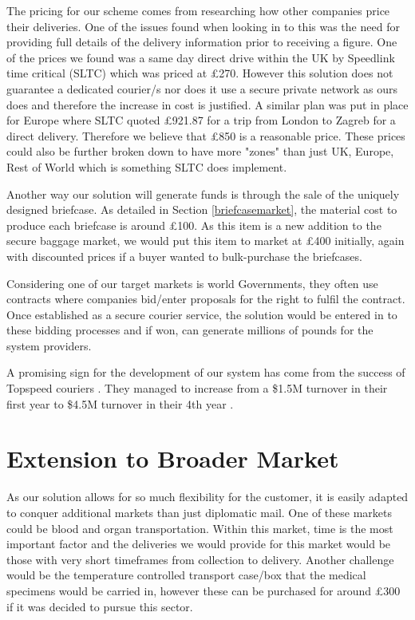 The pricing for our scheme comes from researching how other companies price their deliveries. One of the issues found when looking in to this was the need for providing full details of the delivery information prior to receiving a figure. One of the prices we found was a same day direct drive within the UK by Speedlink time critical (SLTC) which was priced at £270. However this solution does not guarantee a dedicated courier/s nor does it use a secure private network as ours does and therefore the increase in cost is justified. A similar plan was put in place for Europe where SLTC quoted £921.87 for a trip from London to Zagreb for a direct delivery. Therefore we believe that £850 is a reasonable price. These prices could also be further broken down to have more "zones" than just UK, Europe, Rest of World which is something SLTC does implement. 

Another way our solution will generate funds is through the sale of the uniquely designed briefcase. As detailed in Section \ref{briefcasemarket}, the material cost to produce each briefcase is around £100. As this item is a new addition to the secure baggage market, we would put this item to market at £400 initially, again with discounted prices if a buyer wanted to bulk-purchase the briefcases. 

Considering one of our target markets is world Governments, they often use contracts where companies bid/enter proposals for the right to fulfil the contract. Once established as a secure courier service, the solution would be entered in to these bidding processes and if won, can generate millions of pounds for the system providers. 

A promising sign for the development of our system has come from the success of Topspeed couriers \cite{topspeed}. They managed to increase from a \$1.5M turnover in their first year to \$4.5M turnover in their 4th year \cite{smesVideo}.

\section{Extension to Broader Market}
As our solution allows for so much flexibility for the customer, it is easily adapted to conquer additional markets than just diplomatic mail. One of these markets could be blood and organ transportation. Within this market, time is the most important factor and the deliveries we would provide for this market would be those with very short timeframes from collection to delivery. Another challenge would be the temperature controlled transport case/box that the medical specimens would be carried in, however these can be purchased for around £300 \cite{courierCoolers} if it was decided to pursue this sector. 

